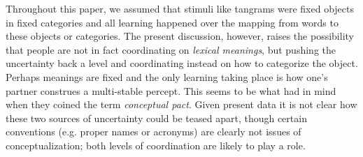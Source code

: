\documentclass[11pt, floatsintext, jou]{apa6}
\begin{document}
Throughout this paper, we assumed that stimuli like tangrams were fixed objects in fixed categories and all learning happened over the mapping from words to these objects or categories. The present discussion, however, raises the possibility that people are not in fact coordinating on \emph{lexical meanings}, but pushing the uncertainty back a level and coordinating instead on how to categorize the object. Perhaps meanings are fixed and the only learning taking place is how one's partner construes a multi-stable percept. This seems to be what  had in mind when they coined the term \emph{conceptual pact}. Given present data it is not clear how these two sources of uncertainty could be teased apart, though certain conventions (e.g. proper names or acronyms) are clearly not issues of conceptualization; both levels of coordination are likely to play a role. 

\end{document}
